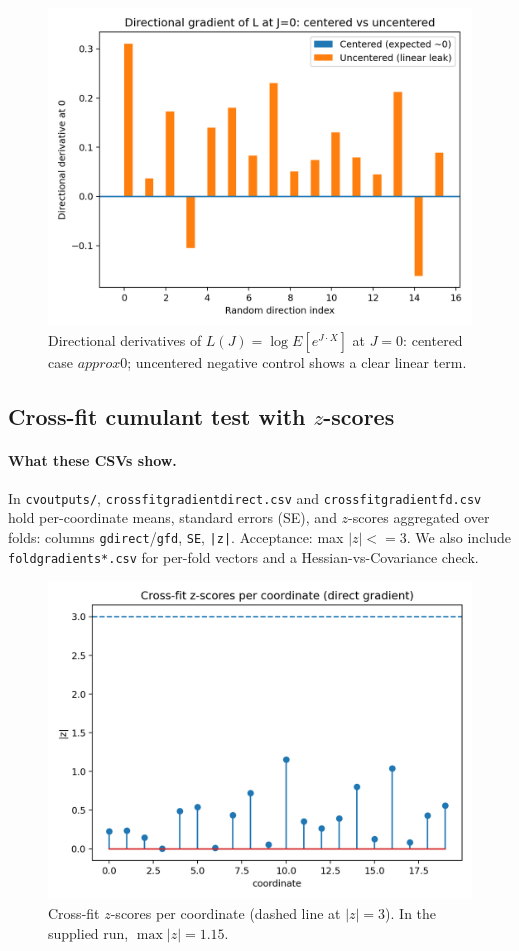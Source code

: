 \documentclass[11pt]{article}
\def\E{E}%
\def\_{}%
\def\le{<=}%
\def\approx{approx}%
\theoremstyle{definition}
\theoremstyle{remark}
\newcommand{\E}{\mathbb{E}}
\newcommand{\1}{\mathbbm{1}}
\newcommand{\pdfmath}[2]{\texorpdfstring{#1}{#2}}
\begin{document}
\begin{figure}[htbp]
\centering
\includegraphics[width=.85\textwidth]{probe_directions.png}
\caption{\pdfmath{Directional derivatives of $L(J)=\log \E[e^{J\cdot X}]$ at $J=0$: centered case $\approx 0$; uncentered negative control shows a clear linear term.}{Directional derivatives at the origin: centered $\approx 0$; uncentered $\neq 0$.}}
\end{figure}

\subsection{Cross-fit cumulant test with $z$-scores}
\paragraph{What these CSVs show.}
In \texttt{cv\_outputs/}, \texttt{crossfit\_gradient\_direct.csv} and \texttt{crossfit\_gradient\_fd.csv} hold per-coordinate means, standard errors (SE), and $z$-scores aggregated over folds:
columns \texttt{g\_direct}/\texttt{g\_fd}, \texttt{SE}, \texttt{|z|}. Acceptance: max $|z|\le 3$.
We also include \texttt{fold\_gradients\_*.csv} for per-fold vectors and a Hessian-vs-Covariance check.

\begin{figure}[htbp]
\centering
\includegraphics[width=.85\textwidth]{zscore_per_coordinate.png}
\caption{\pdfmath{Cross-fit $z$-scores per coordinate (dashed line at $|z|=3$). In the supplied run, $\max |z|=1.15$.}{Cross-fit z-scores per coordinate (cutoff at 3).}}
\end{figure}
\end{document}
